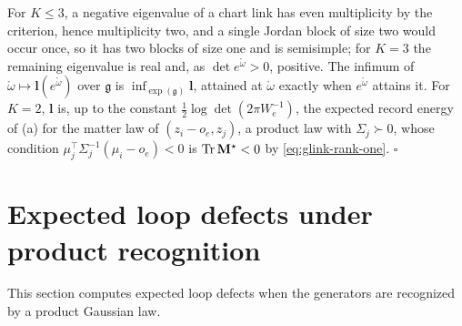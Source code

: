 For \(K\leq3\), a negative eigenvalue of a chart link has even multiplicity by the criterion, hence
multiplicity two, and a single Jordan block of size two would occur once, so it has two blocks of size
one and is semisimple; for \(K=3\) the remaining eigenvalue is real and, as \(\det e^{\mathring\omega}>0\),
positive. The infimum of \(\mathring\omega\mapsto\mathbf l(e^{\mathring\omega})\) over \(\mathfrak g\) is
\(\inf_{\exp(\mathfrak g)}\mathbf l\), attained at \(\mathring\omega\) exactly when \(e^{\mathring\omega}\)
attains it. For \(K=2\), \(\mathbf l\) is, up to the constant \(\tfrac12\log\det(2\pi W_e^{-1})\), the
expected record energy of (a) for the matter law of \((z_i-o_e,z_j)\), a
product law with \(\Sigma_j\succ0\), whose condition \(\mu_j^\top\Sigma_j^{-1}(\mu_i-o_e)<0\) is
\(\operatorname{Tr}\mathbf M^\star<0\) by \eqref{eq:glink-rank-one}. \hfill$\square$

\section{Expected loop defects under product recognition}
\label{sec:glink-loops}

This section computes expected loop defects when the generators are recognized by a product Gaussian
law.

